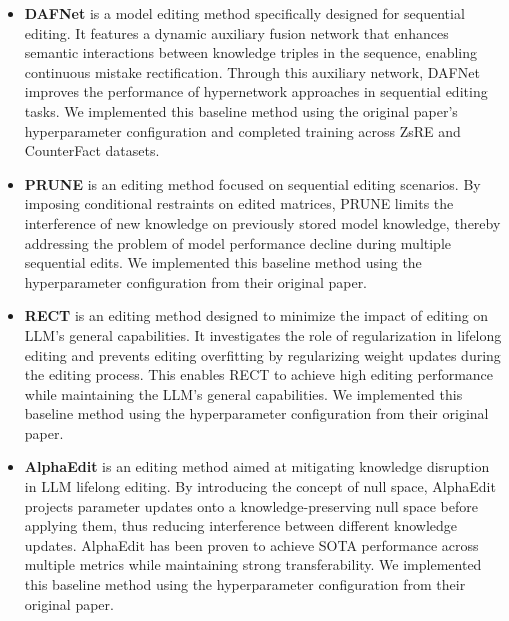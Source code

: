 \begin{itemize}
    \item \textbf{DAFNet} \cite{dafnet} is a model editing method specifically designed for sequential editing. It features a dynamic auxiliary fusion network that enhances semantic interactions between knowledge triples in the sequence, enabling continuous mistake rectification. Through this auxiliary network, DAFNet improves the performance of hypernetwork approaches in sequential editing tasks. We implemented this baseline method using the original paper's hyperparameter configuration and completed training across ZsRE and CounterFact datasets.
    \item \textbf{PRUNE} \cite{prune} is an editing method focused on sequential editing scenarios.  By imposing conditional restraints on edited matrices, PRUNE limits the interference of new knowledge on previously stored model knowledge,  thereby addressing the problem of model performance decline during multiple sequential edits. We implemented this baseline method using the hyperparameter configuration from their original paper.
    \item \textbf{RECT} \cite{rect} is an editing method designed to minimize the impact of editing on LLM's general capabilities. It investigates the role of regularization in lifelong editing and prevents editing overfitting by regularizing weight updates during the editing process. This enables RECT to achieve high editing performance while maintaining the LLM's general capabilities. We implemented this baseline method using the hyperparameter configuration from their original paper.
    \item \textbf{AlphaEdit} \cite{alphaedit} is an editing method aimed at mitigating knowledge disruption in LLM lifelong editing. By introducing the concept of null space, AlphaEdit projects parameter updates onto a knowledge-preserving null space before applying them, thus reducing interference between different knowledge updates. AlphaEdit has been proven to achieve SOTA performance across multiple metrics while maintaining strong transferability. We implemented this baseline method using the hyperparameter configuration from their original paper.
\end{itemize}

